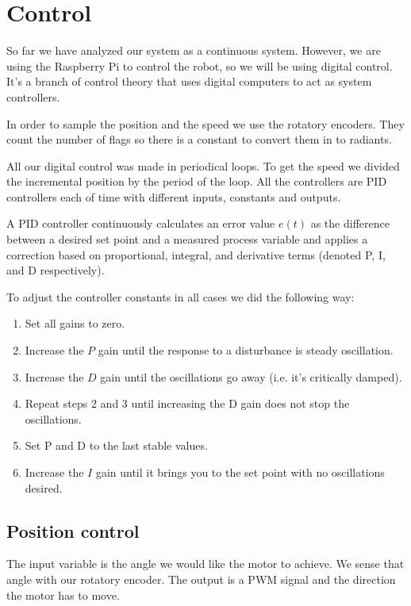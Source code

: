 \section{Control}
So far we have analyzed our system as a continuous system.
However, we are using the Raspberry Pi to control the robot, so we will
be using digital control. It's a branch of control theory that uses
digital computers to act as system controllers.

In order to sample the position and the speed we use the rotatory encoders.
They count the number of flags so there is a constant to convert them in to radiants.

All our digital control was made in periodical loops. To get the speed we
divided the incremental position by the period of the loop. All the controllers
are PID controllers each of time with different inputs, constants and outputs.

A PID controller continuously calculates an error value $e(t)$ as the difference between
a desired set point and a measured process variable and applies a
correction based on proportional, integral, and derivative terms
(denoted P, I, and D respectively).

To adjust the controller constants in all cases we did the following way:

\begin{enumerate}
    \item Set all gains to zero.
    \item Increase the $P$ gain until the response to a disturbance is steady oscillation.
    \item Increase the $D$ gain until the oscillations go away (i.e. it's critically damped).
    \item Repeat steps 2 and 3 until increasing the D gain does not stop the oscillations.
    \item Set P and D to the last stable values.
    \item Increase the $I$ gain until it brings you to the set point with no oscillations desired.
\end{enumerate}

\subsection{Position control}
The input variable is the angle we would like the motor to achieve. We sense that angle
with our rotatory encoder. The output is a PWM signal and the direction the motor has to move.

